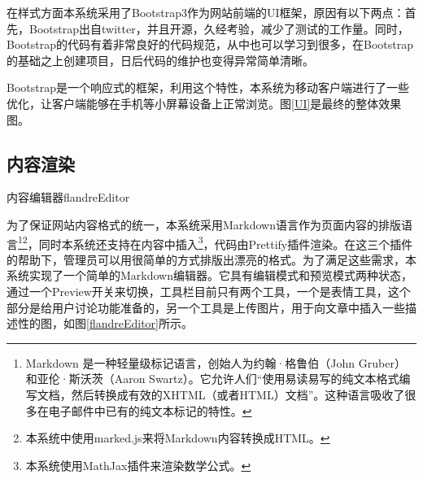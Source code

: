 
在样式方面本系统采用了Bootstrap3作为网站前端的UI框架，原因有以下两点：首先，Bootstrap出自twitter，并且开源，久经考验，减少了测试的工作量。同时，Bootstrap的代码有着非常良好的代码规范，从中也可以学习到很多，在Bootstrap的基础之上创建项目，日后代码的维护也变得异常简单清晰。

Bootstrap是一个响应式的框架，利用这个特性，本系统为移动客户端进行了一些优化，让客户端能够在手机等小屏幕设备上正常浏览。图\ref{UI}是最终的整体效果图。


%


%


\subsection{内容渲染}
\begin{pics}[!htb]{内容编辑器}{flandreEditor}
\end{pics}
为了保证网站内容格式的统一，本系统采用Markdown语言作为页面内容的排版语言\footnote{Markdown 是一种轻量级标记语言，创始人为约翰·格鲁伯（John Gruber）和亚伦·斯沃茨（Aaron Swartz）。它允许人们``使用易读易写的纯文本格式编写文档，然后转换成有效的XHTML（或者HTML）文档''。这种语言吸收了很多在电子邮件中已有的纯文本标记的特性。}\footnote{本系统中使用marked.js来将Markdown内容转换成HTML。}，同时本系统还支持在内容中插入\footnote{本系统使用MathJax插件来渲染数学公式。}，代码由Prettify插件渲染。在这三个插件的帮助下，管理员可以用很简单的方式排版出漂亮的格式。为了满足这些需求，本系统实现了一个简单的Markdown编辑器。它具有编辑模式和预览模式两种状态，通过一个Preview开关来切换，工具栏目前只有两个工具，一个是表情工具，这个部分是给用户讨论功能准备的，另一个工具是上传图片，用于向文章中插入一些描述性的图，如图\ref{flandreEditor}所示。

